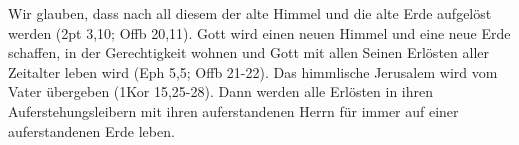 Wir glauben, dass nach all diesem der alte Himmel und die alte Erde aufgelöst werden (2pt 3,10; Offb 20,11). Gott wird einen neuen Himmel und eine neue Erde schaffen, in der Gerechtigkeit wohnen und Gott mit allen Seinen Erlösten aller Zeitalter leben wird (Eph 5,5; Offb 21-22). Das himmlische Jerusalem wird vom Vater übergeben (1Kor 15,25-28). Dann werden alle Erlösten in ihren Auferstehungsleibern mit ihren auferstandenen Herrn für immer auf einer auferstandenen Erde leben.


